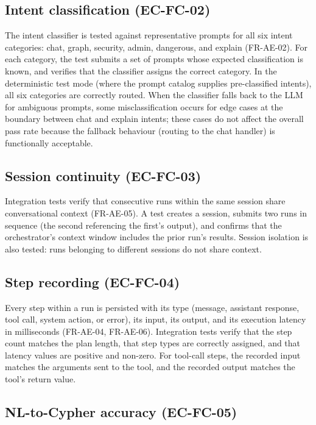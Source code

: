\documentclass[a4paper]{sapthesis}
\begin{document}
\subsection{Intent classification (EC-FC-02)}

The intent classifier is tested against representative prompts for all
six intent categories: chat, graph, security, admin, dangerous, and
explain (FR-AE-02).  For each category, the test submits a set of
prompts whose expected classification is known, and verifies that the
classifier assigns the correct category.  In the deterministic test mode
(where the prompt catalog supplies pre-classified intents), all six
categories are correctly routed.  When the classifier falls back to the
LLM for ambiguous prompts, some misclassification occurs for edge cases
at the boundary between chat and explain intents; these cases do not
affect the overall pass rate because the fallback behaviour (routing to
the chat handler) is functionally acceptable.

\subsection{Session continuity (EC-FC-03)}

Integration tests verify that consecutive runs within the same session
share conversational context (FR-AE-05).  A test creates a session,
submits two runs in sequence (the second referencing the first's output),
and confirms that the orchestrator's context window includes the prior
run's results.  Session isolation is also tested: runs belonging to
different sessions do not share context.

\subsection{Step recording (EC-FC-04)}

Every step within a run is persisted with its type (message, assistant
response, tool call, system action, or error), its input, its output,
and its execution latency in milliseconds (FR-AE-04, FR-AE-06).
Integration tests verify that the step count matches the plan length,
that step types are correctly assigned, and that latency values are
positive and non-zero.  For tool-call steps, the recorded input matches
the arguments sent to the tool, and the recorded output matches the
tool's return value.

\subsection{NL-to-Cypher accuracy (EC-FC-05)}
\end{document}
